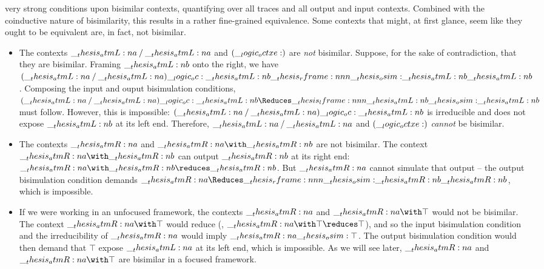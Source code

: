 





 very strong conditions upon bisimilar contexts, quantifying over all traces %
and
all output and input contexts.
Combined with the coinductive nature of bisimilarity, this results in a rather fine-grained equivalence.
Some contexts that might, at first glance, seem like they ought to be equivalent are, in fact, not bisimilar.
\begin{itemize}
\item The contexts $\__thesis_atmL:n {a} \mathbin { / } \__thesis_atmL:n {a}$ and $(\__logic_octxe:)$ are \emph{not} bisimilar.
  Suppose, for the sake of contradiction, that they are bisimilar.
  Framing $\__thesis_atmL:n {b}$ onto the right, we have $(\atmL{a} \pmir \atmL{a}) \oc \atmL{b} \rframe{\osim}{\atmL{b}} \atmL{b}$.
  Composing the input and ouput bisimulation conditions, $(\atmL{a} \pmir \atmL{a}) \oc \atmL{b} \Reduces\lframe{\atmL{b}}{\osim} \atmL{b}$ must follow.
  However, this is impossible: $(\__thesis_atmL:n {a} \mathbin { / } \__thesis_atmL:n {a}) \__logic_oc: \__thesis_atmL:n {b}$ is irreducible and does not expose $\__thesis_atmL:n {b}$ at its left end.
  Therefore, $\__thesis_atmL:n {a} \mathbin { / } \__thesis_atmL:n {a}$ and $(\__logic_octxe:)$ \emph{cannot} be bisimilar.

\item The contexts $\__thesis_atmR:n {a}$ and $\atmR{a} \with \atmR{b}$ are not bisimilar.
  The context $\atmR{a} \with \atmR{b}$ can output $\__thesis_atmR:n {b}$ at its right end: $\atmR{a} \with \atmR{b} \reduces \atmR{b}$.
  But $\__thesis_atmR:n {a}$ cannot simulate that output -- the output bisimulation condition demands $\atmR{a} \Reduces\rframe{\osim}{\atmR{b}} \atmR{b}$, which is impossible.

\item If we were working in an unfocused framework, the contexts $\__thesis_atmR:n {a}$ and $\atmR{a} \with \top$ would not be bisimilar.
  The context $\atmR{a} \with \top$ would reduce (\ie, $\atmR{a} \with \top \reduces \top$), and so the input bisimulation condition and the irreducibility of $\__thesis_atmR:n {a}$ would imply $\__thesis_atmR:n {a} \__thesis_osim: \top$.
  The output bisimulation condition would then demand that $\top$ expose $\__thesis_atmL:n {a}$ at its left end, which is impossible.
  As we will see later, $\__thesis_atmR:n {a}$ and $\atmR{a} \with \top$ are bisimilar in a focused framework.
\end{itemize}

